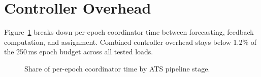 \section{Controller Overhead}

Figure~\ref{fig:overhead} breaks down per-epoch coordinator time between
forecasting, feedback computation, and assignment. Combined controller
overhead stays below 1.2\% of the 250\,ms epoch budget across all
tested loads.

\begin{figure}[h]
\centering
{}
\caption{Share of per-epoch coordinator time by ATS pipeline stage.}
\label{fig:overhead}
\end{figure}
